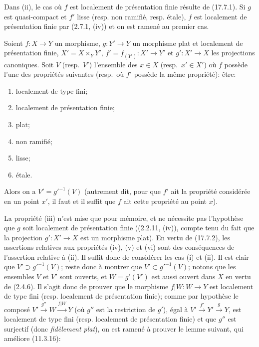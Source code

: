 Dans (ii), le cas où $f$ est localement de présentation finie résulte de (17.7.1). Si $g$ est quasi-compact et $f'$ lisse (resp. non ramifié, resp. étale), $f$ est localement de présentation finie par (2.7.1, (iv)) et on est ramené au premier cas.

\begin{proposition}[17.7.4]
\label{IV.17.7.4}
Soient $f:X\to Y$ un morphisme, $g:Y'\to Y$ un morphisme plat et localement de présentation finie, $X'=X\times_Y Y'$, $f'=f_{(Y')}:X'\to Y'$ et $g':X'\to X$ les
projections canoniques. Soit $V$ \textup{(resp.}\ $V'$\textup{)} l'ensemble des $x\in X$ \textup{(resp.}\ $x'\in X'$\textup{)} où $f$ possède l'une des propriétés suivantes \textup{(resp.}\ où $f'$ possède la même propriété\textup{)}: être:
\begin{enumerate}
  \item[\textup{(i)}] localement de type fini;
  \item[\textup{(ii)}] localement de présentation finie;
  \item[\textup{(iii)}] plat;
  \item[\textup{(iv)}] non ramifié;
  \item[\textup{(v)}] lisse;
  \item[\textup{(vi)}] étale.
\end{enumerate}

Alors on a $V'=g'^{-1}(V)$ \textup{(autrement dit, pour que $f'$ ait la propriété considérée en un point $x'$, il faut et il suffit que $f$ ait cette propriété au point $x$)}.
\end{proposition}

La propriété (iii) n'est mise que pour mémoire, et ne nécessite pas l'hypothèse que $g$ soit localement de présentation finie ((2.2.11, (iv)), compte tenu du fait que la projection $g':X'\to X$ est un morphisme plat). En vertu de (17.7.2), les assertions relatives aux propriétés (iv), (v) et (vi) sont des conséquences de l'assertion relative à (ii). Il suffit donc de considérer les cas (i) et (ii). Il est clair que $V'\supset g'^{-1}(V)$; reste donc à montrer que $V'\subset g'^{-1}(V)$; notons que les ensembles $V$ et $V'$ sont ouverts, et $W=g'(V')$ est aussi ouvert dans $X$ en vertu de (2.4.6). Il s'agit donc de prouver que le morphisme $f|W:W\to Y$ est localement de type fini (resp. localement de présentation finie); comme par hypothèse le composé $V'\xrightarrow{g''}W\xrightarrow{f|W}Y$ (où $g''$ est la restriction de $g'$), égal à $V'\xrightarrow{f'}Y'\xrightarrow{g}Y$, est localement de type fini (resp. localement de présentation finie) et que $g''$ est surjectif (donc \emph{fidèlement plat}), on est ramené à prouver le lemme suivant, qui améliore (11.3.16):

